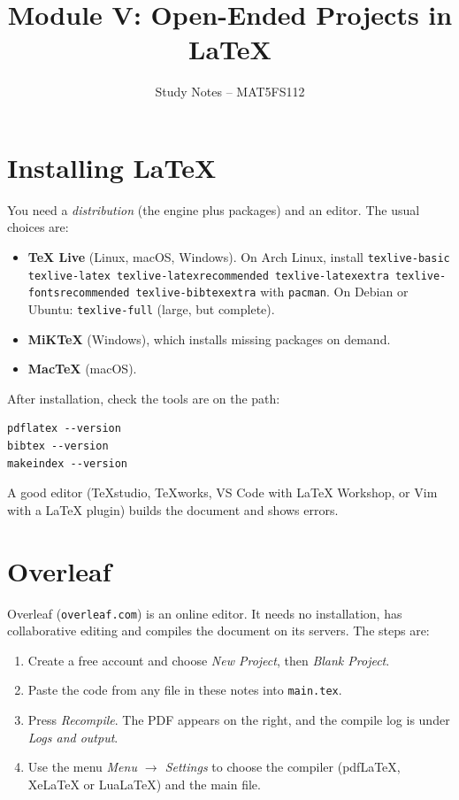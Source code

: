 \documentclass[11pt,a4paper]{article}
\title{Module V: Open-Ended Projects in \LaTeX}
\author{Study Notes -- MAT5FS112}
\date{}
\begin{document}
\maketitle
\tableofcontents

\section{Installing LaTeX}

You need a \emph{distribution} (the engine plus packages) and an
editor. The usual choices are:
\begin{itemize}
  \item \textbf{TeX Live} (Linux, macOS, Windows). On Arch Linux, install
    \texttt{texlive-basic texlive-latex texlive-latexrecommended
    texlive-latexextra texlive-fontsrecommended texlive-bibtexextra}
    with \texttt{pacman}. On Debian or Ubuntu: \texttt{texlive-full}
    (large, but complete).
  \item \textbf{MiKTeX} (Windows), which installs missing packages on
    demand.
  \item \textbf{MacTeX} (macOS).
\end{itemize}

After installation, check the tools are on the path:
\begin{verbatim}
pdflatex --version
bibtex --version
makeindex --version
\end{verbatim}

A good editor (TeXstudio, TeXworks, VS Code with LaTeX Workshop, or
Vim with a LaTeX plugin) builds the document and shows errors.

\section{Overleaf}

Overleaf (\texttt{overleaf.com}) is an online editor. It needs no
installation, has collaborative editing and compiles the document on
its servers. The steps are:
\begin{enumerate}[noitemsep]
  \item Create a free account and choose \emph{New Project}, then
    \emph{Blank Project}.
  \item Paste the code from any file in these notes into \texttt{main.tex}.
  \item Press \emph{Recompile}. The PDF appears on the right, and the
    compile log is under \emph{Logs and output}.
  \item Use the menu \emph{Menu $\rightarrow$ Settings} to choose the
    compiler (pdfLaTeX, XeLaTeX or LuaLaTeX) and the main file.
\end{enumerate}
\end{document}
